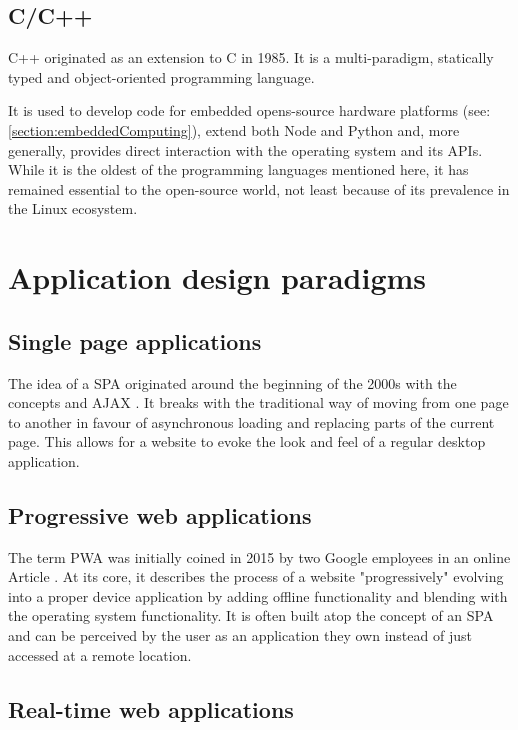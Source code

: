 \subsection{C/C++}

C++ originated as an extension to C in 1985. It is a multi-paradigm, statically typed and object-oriented programming language.

It is used to develop code for embedded opens-source hardware platforms (see: \autoref{section:embeddedComputing}), extend both Node and Python and, more generally, provides direct interaction with the operating system and its APIs. While it is the oldest of the programming languages mentioned here, it has remained essential to the open-source world, not least because of its prevalence in the Linux ecosystem.


\section{Application design paradigms}

\subsection{Single page applications}

The idea of a \ac{SPA} originated around the beginning of the 2000s with the concepts  \parencite{innerBrowsing} and \ac{AJAX} \parencite{ajaxNewApproach}. It breaks with the traditional way of moving from one page to another in favour of asynchronous loading and replacing parts of the current page. This allows for a website to evoke the look and feel of a regular desktop application.

\subsection{Progressive web applications}

The term \ac{PWA} was initially coined in 2015 by two Google employees in an online Article \parencite{progressiveWebApplications}. At its core, it describes the process of a website "progressively" evolving into a proper device application by adding offline functionality and blending with the operating system functionality. It is often built atop the concept of an \ac{SPA} and can be perceived by the user as an application they own instead of just accessed at a remote location.

\subsection{Real-time web applications}

